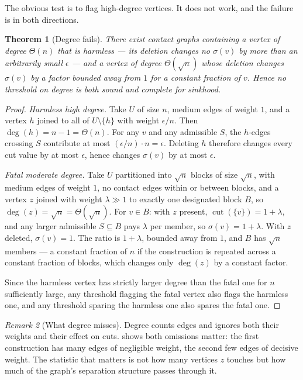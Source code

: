 \documentclass[11pt,a4paper]{article}
\newtheorem{theorem}{Theorem}[section]
\theoremstyle{definition}
\theoremstyle{remark}
\newtheorem{remark}[theorem]{Remark}
\newcommand{\cut}{\operatorname{cut}}
\newcommand{\sep}{\sigma}
\begin{document}
The obvious test is to flag high-degree vertices. It does not work, and
the failure is in both directions.

\begin{theorem}[Degree fails]\label{thm:degree-fails}
There exist contact graphs containing a vertex of degree $\Theta(n)$ that
is harmless --- its deletion changes no $\sep(v)$ by more than an
arbitrarily small $\epsilon$ --- and a vertex of degree
$\Theta(\sqrt{n})$ whose deletion changes $\sep(v)$ by a factor bounded
away from $1$ for a constant fraction of $v$. Hence no threshold on
degree is both sound and complete for sinkhood.
\end{theorem}

\begin{proof}
\emph{Harmless high degree.} Take $U$ of size $n$, medium edges of weight
$1$, and a vertex $h$ joined to all of $U \setminus \{h\}$ with weight
$\epsilon/n$. Then $\deg(h) = n-1 = \Theta(n)$. For any $v$ and any
admissible $S$, the $h$-edges crossing $S$ contribute at most
$(\epsilon/n)\cdot n = \epsilon$. Deleting $h$ therefore changes every
cut value by at most $\epsilon$, hence changes $\sep(v)$ by at most
$\epsilon$.

\emph{Fatal moderate degree.} Take $U$ partitioned into
$\sqrt{n}$ blocks of size $\sqrt{n}$, with medium edges of weight $1$,
no contact edges within or between blocks, and a vertex $z$ joined with
weight $\lambda \gg 1$ to exactly one designated block $B$, so
$\deg(z) = \sqrt{n} = \Theta(\sqrt{n})$. For $v \in B$: with $z$ present,
$\cut(\{v\}) = 1 + \lambda$, and any larger admissible $S \subseteq B$
pays $\lambda$ per member, so $\sep(v) = 1+\lambda$. With $z$ deleted,
$\sep(v) = 1$. The ratio is $1+\lambda$, bounded away from $1$, and $B$
has $\sqrt{n}$ members --- a constant fraction of $n$ if the construction
is repeated across a constant fraction of blocks, which changes only
$\deg(z)$ by a constant factor.

Since the harmless vertex has strictly larger degree than the fatal one
for $n$ sufficiently large, any threshold flagging the fatal vertex also
flags the harmless one, and any threshold sparing the harmless one also
spares the fatal one.
\end{proof}

\begin{remark}[What degree misses]\label{rem:degree}
Degree counts edges and ignores both their weights and their effect on
cuts.  shows both omissions matter: the first
construction has many edges of negligible weight, the second few edges of
decisive weight. The statistic that matters is not how many vertices $z$
touches but how much of the graph's separation structure passes through
it.
\end{remark}
\end{document}
